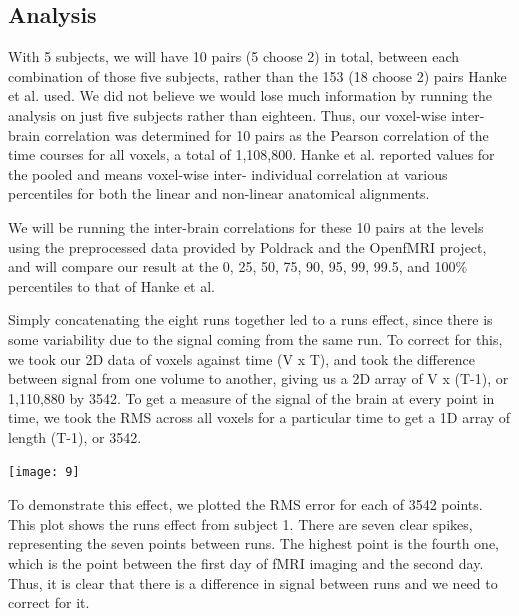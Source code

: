 \documentclass[11pt]{article}
\begin{document}
\subsection{Analysis}
With 5 subjects, we will have 10 pairs (5 choose 2) 
in total, between each combination of those five subjects, rather than the 153
(18 choose 2) pairs Hanke et al. used.  We did not believe we would lose much
information by running the analysis on just five subjects rather than eighteen.
Thus, our voxel-wise inter-brain correlation was determined for 10 pairs as the 
Pearson correlation of the time courses for all voxels, a total of 1,108,800.
Hanke et al. reported values for the pooled and means voxel-wise inter-
individual correlation at various percentiles for both the linear and 
non-linear anatomical alignments.  

We will be running the inter-brain correlations for these 10 pairs at the 
levels using the preprocessed data provided by Poldrack and the OpenfMRI 
project, and will compare our result at the 0, 25, 50, 75, 90, 95, 99, 99.5, 
and 100\% percentiles to that of Hanke et al.

Simply concatenating the eight runs together led to a runs effect, since there
is some variability due to the signal coming from the same run. To correct for 
this, we took our 2D data of voxels against time (V x T), and took the 
difference between signal from one volume to another, giving us a 2D array of 
V x (T-1), or 1,110,880 by 3542. To get a measure of the signal of the brain at 
every point in time, we took the RMS across all voxels for a particular time to 
get a 1D array of length (T-1), or 3542. 

\begin{center}                                                                  
\texttt{[image: 9]}                                                 
\end{center}   

To demonstrate this effect, we plotted the RMS error for each of 3542 points.  
This plot shows the runs effect from subject 1.  There are seven clear spikes, 
representing the seven points between runs.  The highest point is the fourth 
one, which is the point between the first day of fMRI imaging and the second
day.  Thus, it is clear that there is a difference in signal between runs and
we need to correct for it.  
\end{document}
